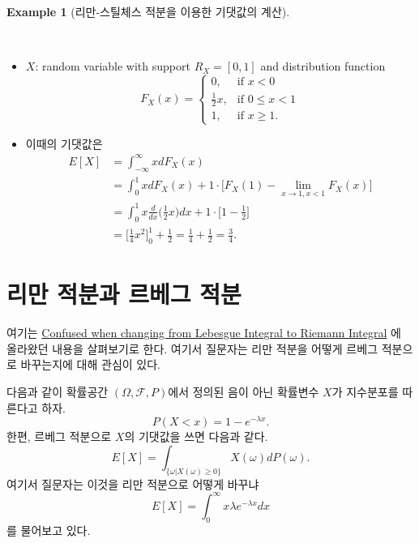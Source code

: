 \documentclass[
  13pt,
  letterpaper,
  DIV=11,
  numbers=noendperiod]{scrreprt}
\theoremstyle{plain}
\theoremstyle{definition}
\newtheorem{example}{Example}[chapter]
\theoremstyle{definition}
\theoremstyle{plain}
\theoremstyle{definition}
\theoremstyle{plain}
\theoremstyle{remark}
\begin{document}
\begin{example}[리만-스틸체스 적분을 이용한 기댓값의
계산]\protect\hypertarget{exm-riemmanstieltjesint01}{}\label{exm-riemmanstieltjesint01}

~

\begin{itemize}
\item
  \(X\): random variable with support \(R_X = [0,1]\) and distribution
  function \[
  F_X(x) = \begin{cases}
  0, &\text{if } x <0\\
  \frac{1}{2}x, &\text{if } 0 \leq x < 1\\
  1, &\text{if } x \geq 1.
  \end{cases}
  \]
\item
  이때의 기댓값은 \[
  \begin{aligned}
  E[X] &= \int_{-\infty}^{\infty} x dF_X(x)\\
  &= \int_0^1 xdF_{X}(x) + 1\cdot \Big[ F_X(1) -\lim_{x\rightarrow 1, x < 1}F_X(x) \Big]\\
  &= \int_0^1 x \frac{d}{dx} \Big(\frac{1}{2}x \Big) dx  + 1 \cdot \Big[ 1- \frac{1}{2} \Big]\\
  &= \Big[\frac{1}{4}x^2 \Big]_{0}^1 + \frac{1}{2} = \frac{1}{4}+\frac{1}{2}=\frac{3}{4}.
  \end{aligned}
  \]
\end{itemize}

\end{example}

\section{리만 적분과 르베그
적분}\label{uxb9acuxb9cc-uxc801uxbd84uxacfc-uxb974uxbca0uxadf8-uxc801uxbd84}

여기는
\href{https://math.stackexchange.com/questions/2958787/confused-when-changing-from-lebesgue-integral-to-riemann-integral}{Confused
when changing from Lebesgue Integral to Riemann Integral} 에 올라왔던
내용을 살펴보기로 한다. 여기서 질문자는 리만 적분을 어떻게 르베그
적분으로 바꾸는지에 대해 관심이 있다.

다음과 같이 확률공간 \((\Omega, \mathcal{F}, P)\)에서 정의된 음이 아닌
확률변수 \(X\)가 지수분포를 따른다고 하자. \[
P(X<x) = 1-e^{-\lambda x}.
\] 한편, 르베그 적분으로 \(X\)의 기댓값을 쓰면 다음과 같다. \[
E[X] = \int_{\{\omega | X(\omega) \geq 0 \}} X(\omega) dP(\omega).
\] 여기서 질문자는 이것을 리만 적분으로 어떻게 바꾸냐 \[
E[X] = \int_0^\infty x \lambda e^{-\lambda x}dx
\] 를 물어보고 있다.
\end{document}
